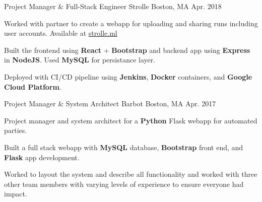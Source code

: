

\begin{cventries}

  \cventry
    {Project Manager \& Full-Stack Engineer} %
    {Strolle} %
    {Boston, MA} %
    {Apr. 2018} %
    {
      \begin{cvitems} %
        \item Worked with partner to create a webapp for uploading and sharing runs including user accounts. Available at \href{https://strolle.ml/}{strolle.ml} 
        \item Built the frontend using \textbf{React} + \textbf{Bootstrap} and backend app using \textbf{Express} in \textbf{NodeJS}. Used \textbf{MySQL} for persistance layer.
        \item Deployed with CI/CD pipeline using \textbf{Jenkins}, \textbf{Docker} containers, and \textbf{Google Cloud Platform}.
      \end{cvitems}
    }

  \cventry
    {Project Manager \& System Architect} %
    {Barbot} %
    {Boston, MA} %
    {Apr. 2017} %
    {
      \begin{cvitems} %
        \item Project manager and system architect for a \textbf{Python} Flask webapp for automated parties. 
	      \item Built a full stack webapp with \textbf{MySQL} database, \textbf{Bootstrap} front end, and \textbf{Flask} app development. 
	      \item Worked to layout the system and describe all functionality and worked with three other team members with varying levels of experience to ensure everyone had impact. 
      \end{cvitems}
    }

\end{cventries}
